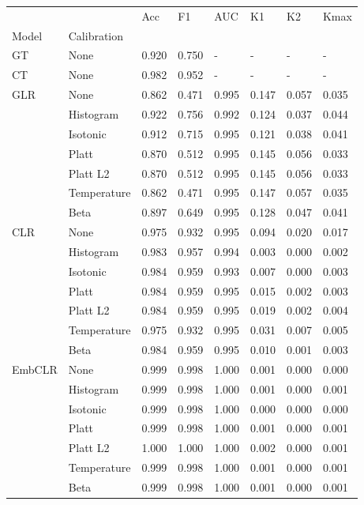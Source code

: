 \begin{tabular}{llllllll}
\toprule
 &  & Acc & F1 & AUC & K1 & K2 & Kmax \\
Model & Calibration &  &  &  &  &  &  \\
\midrule
GT & None & 0.920 & 0.750 & - & - & - & - \\
\cline{1-8}
CT & None & 0.982 & 0.952 & - & - & - & - \\
\cline{1-8}
\multirow[t]{7}{*}{GLR} & None & 0.862 & 0.471 & 0.995 & 0.147 & 0.057 & 0.035 \\
 & Histogram & 0.922 & 0.756 & 0.992 & 0.124 & 0.037 & 0.044 \\
 & Isotonic & 0.912 & 0.715 & 0.995 & 0.121 & 0.038 & 0.041 \\
 & Platt & 0.870 & 0.512 & 0.995 & 0.145 & 0.056 & 0.033 \\
 & Platt L2 & 0.870 & 0.512 & 0.995 & 0.145 & 0.056 & 0.033 \\
 & Temperature & 0.862 & 0.471 & 0.995 & 0.147 & 0.057 & 0.035 \\
 & Beta & 0.897 & 0.649 & 0.995 & 0.128 & 0.047 & 0.041 \\
\cline{1-8}
\multirow[t]{7}{*}{CLR} & None & 0.975 & 0.932 & 0.995 & 0.094 & 0.020 & 0.017 \\
 & Histogram & 0.983 & 0.957 & 0.994 & 0.003 & 0.000 & 0.002 \\
 & Isotonic & 0.984 & 0.959 & 0.993 & 0.007 & 0.000 & 0.003 \\
 & Platt & 0.984 & 0.959 & 0.995 & 0.015 & 0.002 & 0.003 \\
 & Platt L2 & 0.984 & 0.959 & 0.995 & 0.019 & 0.002 & 0.004 \\
 & Temperature & 0.975 & 0.932 & 0.995 & 0.031 & 0.007 & 0.005 \\
 & Beta & 0.984 & 0.959 & 0.995 & 0.010 & 0.001 & 0.003 \\
\cline{1-8}
\multirow[t]{7}{*}{EmbCLR} & None & 0.999 & 0.998 & 1.000 & 0.001 & 0.000 & 0.000 \\
 & Histogram & 0.999 & 0.998 & 1.000 & 0.001 & 0.000 & 0.001 \\
 & Isotonic & 0.999 & 0.998 & 1.000 & 0.000 & 0.000 & 0.000 \\
 & Platt & 0.999 & 0.998 & 1.000 & 0.001 & 0.000 & 0.001 \\
 & Platt L2 & 1.000 & 1.000 & 1.000 & 0.002 & 0.000 & 0.001 \\
 & Temperature & 0.999 & 0.998 & 1.000 & 0.001 & 0.000 & 0.001 \\
 & Beta & 0.999 & 0.998 & 1.000 & 0.001 & 0.000 & 0.001 \\
\cline{1-8}
\bottomrule
\end{tabular}
